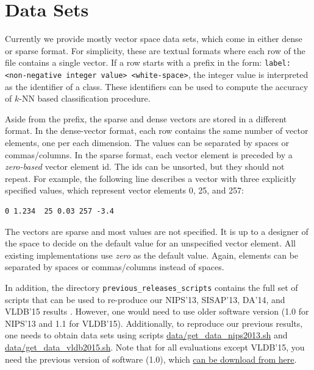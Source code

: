 \documentclass[runningheads,a4paper]{llncs}
\newcommand{\replocfile}{https://github.com/searchivarius/NonMetricSpaceLib/blob/pserv/}
\newcommand{\ttt}[1]{\texttt{#1}}
\newcommand{\knn}{$k$-NN }
\begin{document}
\section{Data Sets}
\label{SectionDatasets}
Currently we provide mostly vector space data sets,
which come in either dense or sparse format.
For simplicity, these are textual formats where each row of the file contains a single vector.
If a row starts with a prefix in the form: \ttt{label:<non-negative integer value> <white-space>},
the integer value is interpreted as the identifier of a class.
These identifiers can be used to compute the accuracy of \knn based classification procedure.

Aside from the prefix, the sparse and dense vectors are stored in a different format.
In the dense-vector format, each row
contains the same number of vector elements, one per each dimension.
The values can be separated by spaces or commas/columns.
In the sparse format, each vector element is preceded
by a \emph{zero-based} vector element id. 
The ids can be unsorted, but they should not repeat.
For example, the following line
describes a vector with three explicitly specified values,
which represent vector elements 0, 25, and 257:
\begin{verbatim}
0 1.234  25 0.03 257 -3.4 
\end{verbatim}

The vectors are sparse and most values are not specified.
It is up to a designer of the space to decide on the default value for an unspecified vector element.
All existing implementations use \emph{zero} as the default value.
Again, elements can be separated by spaces or commas/columns instead of spaces.

In addition, the directory \ttt{previous\_releases\_scripts} contains the full set of scripts that can be used to re-produce our NIPS'13, SISAP'13, DA'14, and VLDB'15 results \cite{Boytsov_and_Bilegsaikhan:sisap2013,Boytsov_and_Bilegsaikhan:nips2013,ponomarenko2014comparative,naidan2015permutation}.
However, one would need to use older software version (1.0 for NIPS'13 and 1.1 for VLDB'15).
Additionally, to reproduce our previous results, one needs to obtain data sets using scripts
\href{\replocfile data/get_data_nips2013.sh}{data/get\_data\_nips2013.sh} 
and \href{\replocfile data/get_data_vldb2015.sh}{data/get\_data\_vldb2015.sh}. 
Note that for all evaluations except VLDB'15, you need the previous version of software (1.0),
which \href{https://github.com/searchivarius/NonMetricSpaceLib/releases}{can be download from here}.
\end{document}
